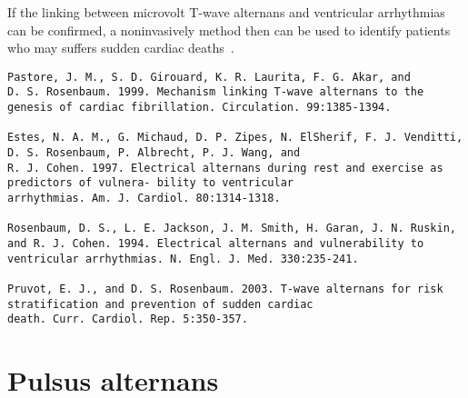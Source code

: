 \begin{framed}
  If the linking between microvolt T-wave alternans and ventricular
  arrhythmias can be confirmed, a noninvasively method then can be
  used to identify patients who may suffers sudden cardiac
  deaths~\citep{rosenbaum2001}.
\end{framed}

\begin{verbatim}
Pastore, J. M., S. D. Girouard, K. R. Laurita, F. G. Akar, and
D. S. Rosenbaum. 1999. Mechanism linking T-wave alternans to the
genesis of cardiac fibrillation. Circulation. 99:1385-1394.

Estes, N. A. M., G. Michaud, D. P. Zipes, N. ElSherif, F. J. Venditti,
D. S. Rosenbaum, P. Albrecht, P. J. Wang, and
R. J. Cohen. 1997. Electrical alternans during rest and exercise as
predictors of vulnera- bility to ventricular
arrhythmias. Am. J. Cardiol. 80:1314-1318.

Rosenbaum, D. S., L. E. Jackson, J. M. Smith, H. Garan, J. N. Ruskin,
and R. J. Cohen. 1994. Electrical alternans and vulnerability to
ventricular arrhythmias. N. Engl. J. Med. 330:235-241.

Pruvot, E. J., and D. S. Rosenbaum. 2003. T-wave alternans for risk
stratification and prevention of sudden cardiac
death. Curr. Cardiol. Rep. 5:350-357.
\end{verbatim}

\section{Pulsus alternans}
\label{sec:pulsus-alternans}




